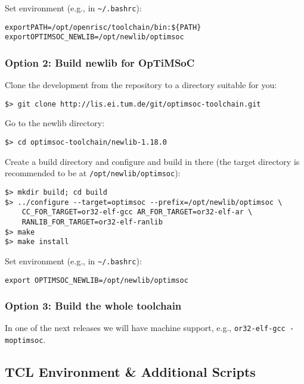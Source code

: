 Set environment (e.g., in \verb|~/.bashrc|):

\begin{alltt}
export PATH=/opt/openrisc/toolchain/bin:\$\{PATH\}
export OPTIMSOC_NEWLIB=/opt/newlib/optimsoc
\end{alltt}

\subsubsection{Option 2: Build newlib for OpTiMSoC}

Clone the development from the repository to a directory suitable for
you:

\begin{verbatim}
$> git clone http://lis.ei.tum.de/git/optimsoc-toolchain.git
\end{verbatim}

Go to the newlib directory:

\begin{verbatim}
$> cd optimsoc-toolchain/newlib-1.18.0
\end{verbatim}

Create a build directory and configure and build in there (the target
directory is recommended to be at \verb|/opt/newlib/optimsoc|):

\begin{verbatim}
$> mkdir build; cd build
$> ../configure --target=optimsoc --prefix=/opt/newlib/optimsoc \
    CC_FOR_TARGET=or32-elf-gcc AR_FOR_TARGET=or32-elf-ar \
    RANLIB_FOR_TARGET=or32-elf-ranlib
$> make
$> make install
\end{verbatim}

Set environment (e.g., in \verb|~/.bashrc|):

\begin{verbatim}
export OPTIMSOC_NEWLIB=/opt/newlib/optimsoc
\end{verbatim}


\subsubsection{Option 3: Build the whole toolchain}

In one of the next releases we will have machine support, e.g.,
\verb|or32-elf-gcc -moptimsoc|.

\subsection{TCL Environment \& Additional Scripts}

